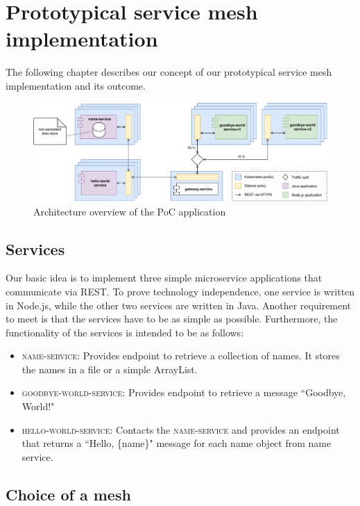 \section{Prototypical service mesh implementation}

The following chapter describes our concept of our prototypical service mesh implementation and its outcome.

\begin{figure}
    \centering
    \includegraphics[width=\textwidth]{img/diagram-draft.pdf}
    \caption{Architecture overview of the PoC application}
    \label{fig:poc-overview}
\end{figure}

\subsection{Services}

Our basic idea is to implement three simple microservice applications that communicate via REST. To prove technology independence, one service is written in Node.js, while the other two services are written in Java. Another requirement to meet is that the services have to be as simple as possible. Furthermore, the functionality of the services is intended to be as follows:

\begin{itemize}
\item \textsc{name-service}: Provides endpoint to retrieve a collection of names. It stores the names in a file or a simple ArrayList.
\item \textsc{goodbye-world-service}: Provides endpoint to retrieve a message ``Goodbye, World!"
\item \textsc{hello-world-service}: Contacts the \textsc{name-service} and provides an endpoint that returns a ``Hello, \{name\}" message for each name object from name service.
\end{itemize}

\subsection{Choice of a mesh}

